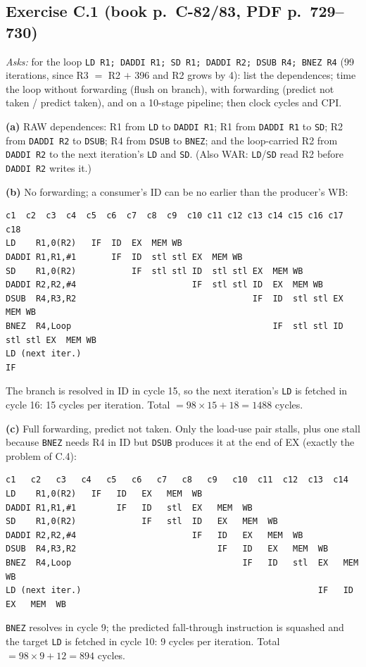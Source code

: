 \documentclass[11pt]{article}
\newcommand{\ex}[3]{\subsection*{Exercise #1 \normalfont\small(book p.~#2, PDF p.~#3)}%
  \addcontentsline{toc}{subsection}{Exercise #1}}
\begin{document}
\ex{C.1}{C-82/83}{729--730}
\emph{Asks:} for the loop \texttt{LD R1; DADDI R1; SD R1; DADDI R2; DSUB R4;
BNEZ R4} (99 iterations, since R3 $=$ R2 $+$ 396 and R2 grows by 4): list
the dependences; time the loop without forwarding (flush on branch), with
forwarding (predict not taken / predict taken), and on a 10-stage pipeline;
then clock cycles and CPI.
\begin{solution}
\textbf{(a)} RAW dependences: R1 from \texttt{LD} to \texttt{DADDI R1};
R1 from \texttt{DADDI R1} to \texttt{SD}; R2 from \texttt{DADDI R2} to
\texttt{DSUB}; R4 from \texttt{DSUB} to \texttt{BNEZ}; and the loop-carried
R2 from \texttt{DADDI R2} to the next iteration's \texttt{LD} and
\texttt{SD}. (Also WAR: \texttt{LD}/\texttt{SD} read R2 before
\texttt{DADDI R2} writes it.)

\textbf{(b)} No forwarding; a consumer's ID can be no earlier than the
producer's WB:
\begin{lstlisting}[basicstyle=\ttfamily\scriptsize,keywords={}]
                 c1  c2  c3  c4  c5  c6  c7  c8  c9  c10 c11 c12 c13 c14 c15 c16 c17 c18
LD    R1,0(R2)   IF  ID  EX  MEM WB
DADDI R1,R1,#1       IF  ID  stl stl EX  MEM WB
SD    R1,0(R2)           IF  stl stl ID  stl stl EX  MEM WB
DADDI R2,R2,#4                       IF  stl stl ID  EX  MEM WB
DSUB  R4,R3,R2                                   IF  ID  stl stl EX  MEM WB
BNEZ  R4,Loop                                        IF  stl stl ID  stl stl EX  MEM WB
LD (next iter.)                                                              IF
\end{lstlisting}
The branch is resolved in ID in cycle 15, so the next iteration's
\texttt{LD} is fetched in cycle 16: 15 cycles per iteration. Total $=
98\times15 + 18 = 1488$ cycles.

\textbf{(c)} Full forwarding, predict not taken. Only the load-use pair
stalls, plus one stall because \texttt{BNEZ} needs R4 in ID but
\texttt{DSUB} produces it at the end of EX (exactly the problem of C.4):
\begin{lstlisting}[basicstyle=\ttfamily\scriptsize,keywords={}]
                 c1   c2   c3   c4   c5   c6   c7   c8   c9   c10  c11  c12  c13  c14
LD    R1,0(R2)   IF   ID   EX   MEM  WB
DADDI R1,R1,#1        IF   ID   stl  EX   MEM  WB
SD    R1,0(R2)             IF   stl  ID   EX   MEM  WB
DADDI R2,R2,#4                       IF   ID   EX   MEM  WB
DSUB  R4,R3,R2                            IF   ID   EX   MEM  WB
BNEZ  R4,Loop                                  IF   ID   stl  EX   MEM  WB
LD (next iter.)                                               IF   ID   EX   MEM  WB
\end{lstlisting}
\texttt{BNEZ} resolves in cycle 9; the predicted fall-through instruction is
squashed and the target \texttt{LD} is fetched in cycle 10: 9 cycles per
iteration. Total $= 98\times9 + 12 = 894$ cycles.


\end{solution}
\end{document}
